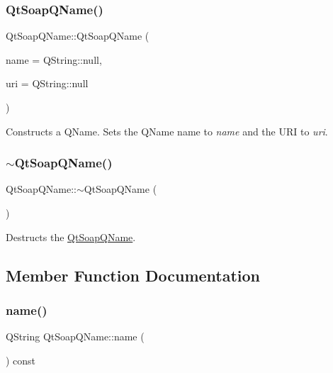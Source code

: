 \subsubsection{\texorpdfstring{Qt\+Soap\+Q\+Name()}{QtSoapQName()}}
{\footnotesize\ttfamily Qt\+Soap\+Q\+Name\+::\+Qt\+Soap\+Q\+Name (\begin{DoxyParamCaption}\item[{const Q\+String \&}]{name = {\ttfamily QString\+:\+:null},  }\item[{const Q\+String \&}]{uri = {\ttfamily QString\+:\+:null} }\end{DoxyParamCaption})}

Constructs a Q\+Name. Sets the Q\+Name name to {\itshape name} and the U\+RI to {\itshape uri}. \mbox{\label{class_qt_soap_q_name_a24085961dcaebe30f08f2069e00b3d4a}} 
\subsubsection{\texorpdfstring{$\sim$\+Qt\+Soap\+Q\+Name()}{~QtSoapQName()}}
{\footnotesize\ttfamily Qt\+Soap\+Q\+Name\+::$\sim$\+Qt\+Soap\+Q\+Name (\begin{DoxyParamCaption}{ }\end{DoxyParamCaption})}

Destructs the \mbox{\hyperlink{class_qt_soap_q_name}{Qt\+Soap\+Q\+Name}}. 

\subsection{Member Function Documentation}
\mbox{\label{class_qt_soap_q_name_ab788bc414e5709a56e2f8db2403028b7}} 
\subsubsection{\texorpdfstring{name()}{name()}}
{\footnotesize\ttfamily Q\+String Qt\+Soap\+Q\+Name\+::name (\begin{DoxyParamCaption}{ }\end{DoxyParamCaption}) const}

